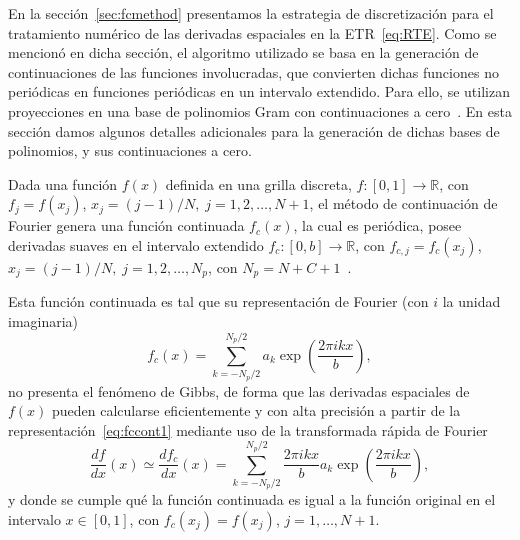 En la sección~\ref{sec:fcmethod} presentamos la estrategia de discretización 
para el tratamiento numérico de las derivadas espaciales en la ETR~\eqref{eq:RTE}. 
Como se mencionó en dicha sección, el algoritmo utilizado se basa 
en la generación de continuaciones de las funciones involucradas, 
que convierten dichas funciones no periódicas en funciones periódicas 
en un intervalo extendido. Para ello, se utilizan proyecciones en una base 
de polinomios Gram con continuaciones a cero~\cite{Amlani2016}. En esta sección damos algunos detalles 
adicionales para la generación de dichas bases de polinomios, y sus continuaciones a cero.

Dada una función $f(x)$ definida en una grilla discreta, $f:[0,1]\rightarrow \mathbb{R}$, 
con $f_j=f(x_j)$, $x_j=(j-1)/N,\;j=1,2,\ldots,N+1$, el método de continuación de 
Fourier genera una función continuada $f_c(x)$, la cual es periódica, posee 
derivadas suaves en el intervalo extendido $f_c: [0,b] \rightarrow \mathbb{R}$, con $f_{c,j}=f_c(x_j)$, $x_j=(j-1)/N,\;j=1,2,\ldots,N_p$, con 
$N_p=N+C+1$~\cite{Albin2011,Amlani2016}.

Esta función continuada es tal que su representación de Fourier (con $i$ la unidad imaginaria)
\begin{equation}
f_c(x)=\sum_{k=-N_p/2}^{N_p/2} a_k \exp\left( \frac{2\pi i k x}{b} \right),
\label{eq:fccont1}
\end{equation}
no presenta el fenómeno de Gibbs, de forma que las derivadas espaciales de $f(x)$ 
pueden calcularse eficientemente y con alta precisión a partir de la representación~\eqref{eq:fccont1} mediante uso de la transformada rápida de Fourier
\begin{equation}
\frac{df}{dx}(x)\simeq \frac{df_c}{dx}(x)=\sum_{k=-N_p/2}^{N_p/2} \frac{2\pi i k x}{b} a_k \exp\left( \frac{2\pi i k x}{b} \right),
\label{eq:fccont2}
\end{equation}
y donde se cumple qué la función continuada es igual a la función original en el intervalo $x\in[0,1]$, con $f_c(x_j)=f(x_j)$, $j=1,\ldots,N+1$.

